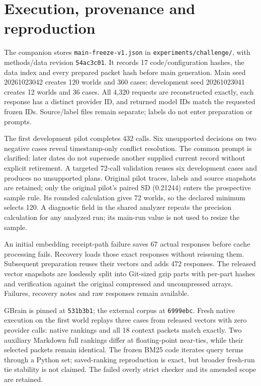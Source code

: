 \section{Execution, provenance and reproduction}
\label{sec:reproduction}
The companion stores \texttt{main-freeze-v1.json} in \texttt{experiments/challenge/}, with methods/data revision \texttt{54ac3c01}. It records 17 code/configuration hashes, the data index and every prepared packet hash before main generation. Main seed 20261023042 creates 120 worlds and 360 cases; development seed 20261023041 creates 12 worlds and 36 cases. All 4,320 requests are reconstructed exactly, each response has a distinct provider ID, and returned model IDs match the requested frozen IDs. Source/label files remain separate; labels do not enter preparation or prompts.

The first development pilot completes 432 calls. Six unsupported decisions on two negative cases reveal timestamp-only conflict resolution. The common prompt is clarified: later dates do not supersede another supplied current record without explicit retirement. A targeted 72-call validation reuses six development cases and produces no unsupported plans. Original pilot traces, labels and source snapshots are retained; only the original pilot's paired SD (0.21244) enters the prospective sample rule. Its rounded calculation gives 72 worlds, so the declared minimum selects 120. A diagnostic field in the shared analyzer repeats the precision calculation for any analyzed run; its main-run value is not used to resize the sample.

An initial embedding receipt-path failure saves 67 actual responses before cache processing fails. Recovery loads those exact responses without reissuing them. Subsequent preparation reuses their vectors and adds 472 responses. The released vector snapshots are losslessly split into Git-sized gzip parts with per-part hashes and verification against the original compressed and uncompressed arrays. Failures, recovery notes and raw responses remain available.

GBrain is pinned at \texttt{531b3b1}; the external corpus at \texttt{6999ebc}. Fresh native execution on the first world replays three cases from released vectors with zero provider calls: native rankings and all 18 context packets match exactly. Two auxiliary Markdown full rankings differ at floating-point near-ties, while their selected packets remain identical. The frozen BM25 code iterates query terms through a Python set; saved-ranking reproduction is exact, but broader fresh-run tie stability is not claimed. The failed overly strict checker and its amended scope are retained.

